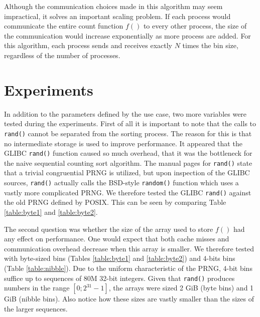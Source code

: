 \documentclass[10pt,a4paper]{article}
\begin{document}
Although the communication choices made in this algorithm may seem impractical, it solves an important scaling problem. If each process would communicate the entire count function $f()$ to every other process, the size of the communication would increase exponentially as more process are added. For this algorithm, each process sends and receives exactly $N$ times the bin size, regardless of the number of processes.

\section{Experiments}

In addition to the parameters defined by the use case, two more variables were tested during the experiments. First of all it is important to note that the calls to \texttt{rand()} cannot be separated from the sorting process. The reason for this is that no intermediate storage is used to improve performance. It appeared that the GLIBC \texttt{rand()} function caused so much overhead, that it was the bottleneck for the naive sequential counting sort algorithm. The manual pages for \texttt{rand()} state that a trivial congruential PRNG is utilized, but upon inspection of the GLIBC sources, \texttt{rand()} actually calls the BSD-style \texttt{random()} function which uses a vastly more complicated PRNG. We therefore tested the GLIBC \texttt{rand()} against the old PRNG defined by POSIX. This can be seen by comparing Table \ref{table:byte1} and \ref{table:byte2}.

The second question was whether the size of the array used to store $f()$ had any effect on performance. One would expect that both cache misses and communication overhead decrease when this array is smaller. We therefore tested with byte-sized bins (Tables \ref{table:byte1} and \ref{table:byte2}) and 4-bits bins (Table \ref{table:nibble}). Due to the uniform characteristic of the PRNG, 4-bit bins suffice up to sequences of 80M 32-bit integers. Given that \texttt{rand()} produces numbers in the range $[0;2^{31}-1]$, the arrays were sized 2 GiB (byte bins) and 1 GiB (nibble bins). Also notice how these sizes are vastly smaller than the sizes of the larger sequences.
\end{document}
